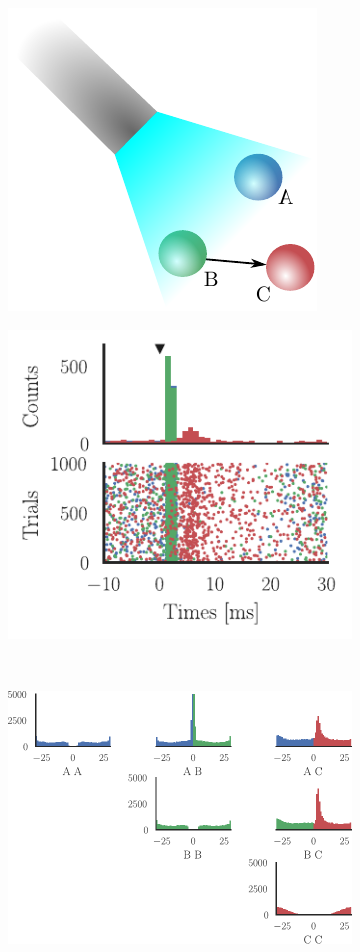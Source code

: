 \documentclass[11pt]{article}
\begin{document}
\begin{figure} 
\makeatletter
\renewcommand\p@subfigure{}
\makeatother
\begin{subfigure}{0.485\textwidth} \includegraphics[scale=1]{simple}
\caption{} \label{fig:intro:1}
\end{subfigure}\hfill
\begin{subfigure}{0.485\textwidth} \includegraphics[scale=1]{psth_triple}
\caption{} \label{fig:intro:2}
\end{subfigure}\medskip\\
\begin{subfigure}{\textwidth}\centering \includegraphics[scale=1]{xcorr}

\end{subfigure}
\end{figure}
\end{document}
